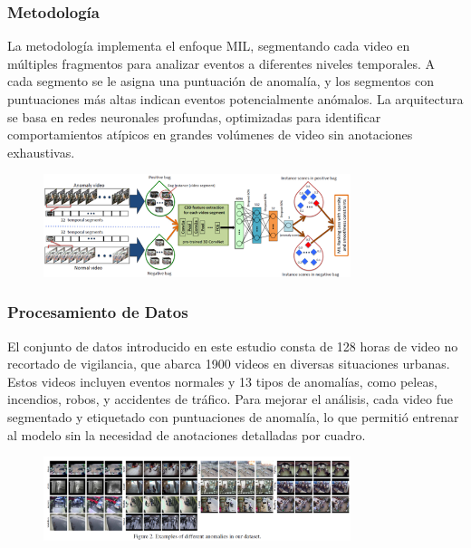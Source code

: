 \subsubsection{Metodología}
La metodología implementa el enfoque MIL, segmentando cada video en múltiples fragmentos para analizar eventos a diferentes niveles temporales. A cada segmento se le asigna una puntuación de anomalía, y los segmentos con puntuaciones más altas indican eventos potencialmente anómalos. La arquitectura se basa en redes neuronales profundas, optimizadas para identificar comportamientos atípicos en grandes volúmenes de video sin anotaciones exhaustivas.

\begin{figure}[h] %
    \centering
    \includegraphics[width=0.8\textwidth]{4/met5.png} %
    \label{fig:ejemplo} %
\end{figure}


\subsubsection{Procesamiento de Datos}
El conjunto de datos introducido en este estudio consta de 128 horas de video no recortado de vigilancia, que abarca 1900 videos en diversas situaciones urbanas. Estos videos incluyen eventos normales y 13 tipos de anomalías, como peleas, incendios, robos, y accidentes de tráfico. Para mejorar el análisis, cada video fue segmentado y etiquetado con puntuaciones de anomalía, lo que permitió entrenar al modelo sin la necesidad de anotaciones detalladas por cuadro.

\begin{figure}[h] %
    \centering
    \includegraphics[width=0.8\textwidth]{4/pro5.png} %
    \label{fig:ejemplo} %
\end{figure}

